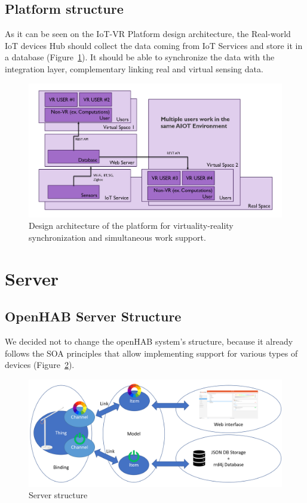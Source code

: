 \subsection{Platform structure}

As it can be seen on the IoT-VR Platform design architecture, the Real-world IoT devices Hub should collect the data coming from IoT Services and store it in a database (Figure~\ref{fig:StructureVersion2-figure}). It should be able to synchronize the data with the integration layer, complementary linking real and virtual sensing data.

\begin{figure}
  \centering
  \includegraphics[width=0.9\linewidth]{figures/StructureVersion2.png}
  \caption{Design architecture of the platform for virtuality-reality synchronization and simultaneous work support.}
  \label{fig:StructureVersion2-figure}
\end{figure}

\section{Server}

\subsection{OpenHAB Server Structure}

We decided not to change the openHAB system's structure, because it already follows the SOA principles that allow implementing support for various types of devices (Figure~\ref{fig:openHABServerStructure-figure}).

\begin{figure}
  \centering
  \includegraphics[width=0.9\linewidth]{figures/openHABServerStructure.png}
  \caption{Server structure}
  \label{fig:openHABServerStructure-figure}
\end{figure}

